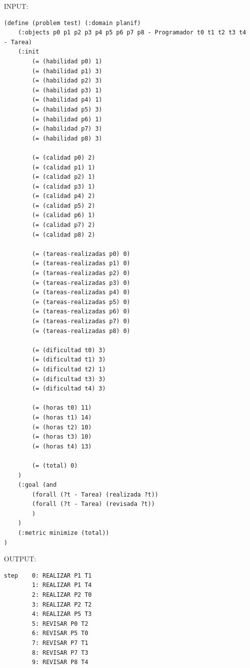 \documentclass[12pt, titlepage]{article}
\begin{document}
INPUT:
\begin{lstlisting}[language=PDDL]
(define (problem test) (:domain planif)
	(:objects p0 p1 p2 p3 p4 p5 p6 p7 p8 - Programador t0 t1 t2 t3 t4 - Tarea)
	(:init
		(= (habilidad p0) 1)
		(= (habilidad p1) 3)
		(= (habilidad p2) 3)
		(= (habilidad p3) 1)
		(= (habilidad p4) 1)
		(= (habilidad p5) 3)
		(= (habilidad p6) 1)
		(= (habilidad p7) 3)
		(= (habilidad p8) 3)
		
		(= (calidad p0) 2)
		(= (calidad p1) 1)
		(= (calidad p2) 1)
		(= (calidad p3) 1)
		(= (calidad p4) 2)
		(= (calidad p5) 2)
		(= (calidad p6) 1)
		(= (calidad p7) 2)
		(= (calidad p8) 2)
		
		(= (tareas-realizadas p0) 0)
		(= (tareas-realizadas p1) 0)
		(= (tareas-realizadas p2) 0)
		(= (tareas-realizadas p3) 0)
		(= (tareas-realizadas p4) 0)
		(= (tareas-realizadas p5) 0)
		(= (tareas-realizadas p6) 0)
		(= (tareas-realizadas p7) 0)
		(= (tareas-realizadas p8) 0)
		
		(= (dificultad t0) 3)
		(= (dificultad t1) 3)
		(= (dificultad t2) 1)
		(= (dificultad t3) 3)
		(= (dificultad t4) 3)
		
		(= (horas t0) 11)
		(= (horas t1) 14)
		(= (horas t2) 10)
		(= (horas t3) 10)
		(= (horas t4) 13)
		
		(= (total) 0)
	)
	(:goal (and
		(forall (?t - Tarea) (realizada ?t))
		(forall (?t - Tarea) (revisada ?t))
		)
	)
	(:metric minimize (total))
)
\end{lstlisting}

OUTPUT:
\begin{lstlisting}
step    0: REALIZAR P1 T1
        1: REALIZAR P1 T4
        2: REALIZAR P2 T0
        3: REALIZAR P2 T2
        4: REALIZAR P5 T3
        5: REVISAR P0 T2
        6: REVISAR P5 T0
        7: REVISAR P7 T1
        8: REVISAR P7 T3
        9: REVISAR P8 T4
\end{lstlisting}
\end{document}
